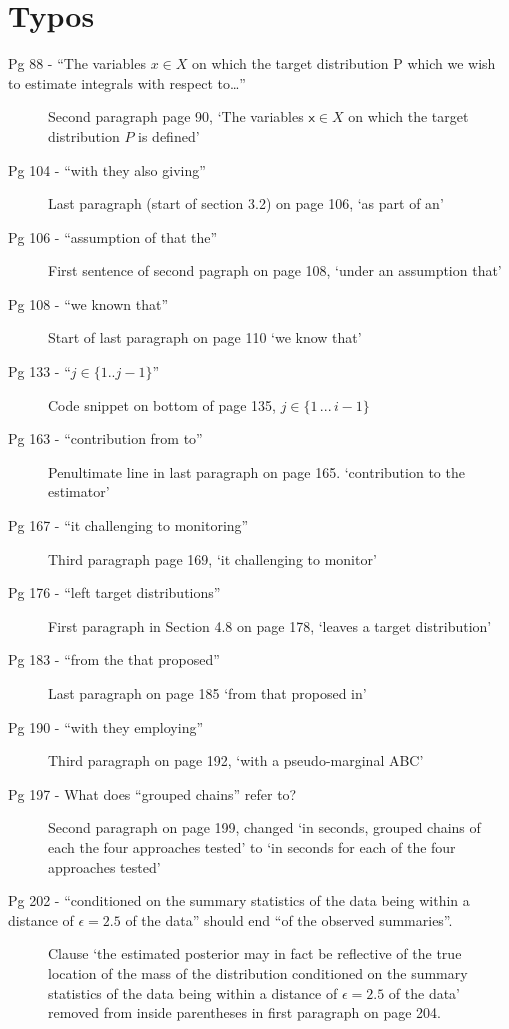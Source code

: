 \documentclass[10pt,a4paper]{article}
\begin{document}
\section*{Typos}\label{typos}

\begin{description}
\item[
  Pg 88 - ``The variables \(x \in X\) on which the target distribution P
  which we wish to estimate integrals with respect to\ldots{}'']
  Second paragraph page 90, `The variables $\boldsymbol{\mathsf{x}} \in X$ on which the target distribution $P$ is defined'
\item[
  Pg 104 - ``with they also giving'']
  Last paragraph (start of section 3.2) on page 106, `as part of an'
\item[
  Pg 106 - ``assumption of that the'']
  First sentence of second pagraph on page 108, `under an assumption that'
\item[
  Pg 108 - ``we known that'']
  Start of last paragraph on page 110 `we know that'
\item[
  Pg 133 - ``\(j \in \{1..j-1\}\)'']
  Code snippet on bottom of page 135, $j \in \lbrace 1 \,...\,i-1\rbrace$
\item[
  Pg 163 - ``contribution from to'']
  Penultimate line in last paragraph on page 165. `contribution to the estimator'
\item[
  Pg 167 - ``it challenging to monitoring'']
  Third paragraph page 169, `it challenging to monitor'
\item[
  Pg 176 - ``left target distributions'']
  First paragraph in Section 4.8 on page 178, `leaves a target distribution'
\item[
  Pg 183 - ``from the that proposed'']
  Last paragraph on page 185 `from that proposed in'
\item[
  Pg 190 - ``with they employing'']
  Third paragraph on page 192, `with a pseudo-marginal ABC'
\item[
  Pg 197 - What does ``grouped chains'' refer to?]  
  Second paragraph on page 199, changed `in seconds, grouped chains of each the four approaches tested' to `in seconds for each of the four approaches tested'  
\item[
  Pg 202 - ``conditioned on the summary statistics of the data being
  within a distance of \(\epsilon=2.5\) of the data'' should end ``of
  the observed summaries''.]
  Clause `the estimated posterior may in fact be reflective of the true location of the mass of the distribution conditioned on the summary statistics of the data being within a distance of $\epsilon = 2.5$ of the data' removed from inside parentheses in first paragraph on page 204. 

\end{description}
\end{document}
